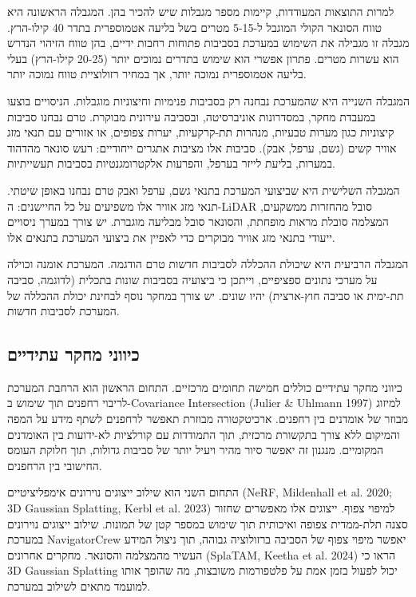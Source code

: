למרות התוצאות המעודדות, קיימות מספר מגבלות שיש להכיר בהן. המגבלה הראשונה היא טווח הסונאר הקולי המוגבל ל-5-15 מטרים בשל בליעה אטמוספרית בתדר 40 קילו-הרץ. מגבלה זו מגבילה את השימוש במערכת בסביבות פתוחות רחבות ידיים, בהן טווח הזיהוי הנדרש הוא עשרות מטרים. פתרון אפשרי הוא שימוש בתדרים נמוכים יותר (20-25 קילו-הרץ) בעלי בליעה אטמוספרית נמוכה יותר, אך במחיר רזולוציית טווח נמוכה יותר.

המגבלה השנייה היא שהמערכת נבחנה רק בסביבות פנימיות וחיצוניות מוגבלות. הניסויים בוצעו במעבדת מחקר, במסדרונות אוניברסיטה, ובסביבה עירונית מבוקרת. טרם נבחנו סביבות קיצוניות כגון מערות טבעיות, מנהרות תת-קרקעיות, יערות צפופים, או אזורים עם תנאי מזג אוויר קשים (גשם, ערפל, אבק). סביבות אלו מציבות אתגרים ייחודיים: רעש סונאר מהדהוד במערות, בליעת לייזר בערפל, והפרעות אלקטרומגנטיות בסביבות תעשייתיות.

המגבלה השלישית היא שביצועי המערכת בתנאי גשם, ערפל ואבק טרם נבחנו באופן שיטתי. תנאי מזג אוויר אלו משפיעים על כל החיישנים: ה-LiDAR סובל מהחזרות ממשקעים, המצלמה סובלת מראות מופחתת, והסונאר סובל מבליעה מוגברת. יש צורך במערך ניסויים ייעודי בתנאי מזג אוויר מבוקרים כדי לאפיין את ביצועי המערכת בתנאים אלו.

המגבלה הרביעית היא שיכולת ההכללה לסביבות חדשות טרם הודגמה. המערכת אומנה וכוילה על מערכי נתונים ספציפיים, וייתכן כי ביצועיה בסביבות שונות בתכלית (לדוגמה, סביבה תת-ימית או סביבה חוץ-ארצית) יהיו שונים. יש צורך במחקר נוסף לבחינת יכולת ההכללה של המערכת לסביבות חדשות.

\subsection{כיווני מחקר עתידיים}
\label{sec:ch09_future_work}

כיווני מחקר עתידיים כוללים חמישה תחומים מרכזיים. התחום הראשון הוא הרחבת המערכת לריבוי רחפנים תוך שימוש ב-Covariance Intersection (Julier & Uhlmann 1997) למיזוג מבוזר של אומדנים בין רחפנים. ארכיטקטורה מבוזרת תאפשר לרחפנים לשתף מידע על המפה והמיקום ללא צורך בתקשורת מרכזית, תוך התמודדות עם קורלציות לא-ידועות בין האומדנים המקומיים. מנגנון זה יאפשר סיור מהיר ויעיל יותר של סביבות גדולות, תוך חלוקת העומס החישובי בין הרחפנים.

התחום השני הוא שילוב ייצוגים נוירונים אימפליציטיים (NeRF, Mildenhall et al. 2020; 3D Gaussian Splatting, Kerbl et al. 2023) למיפוי צפוף. ייצוגים אלו מאפשרים שחזור סצנה תלת-ממדית צפופה ואיכותית תוך שימוש במספר קטן של תמונות. שילוב ייצוגים נוירונים במערכת NavigatorCrew יאפשר מיפוי צפוף של הסביבה ברזולוציה גבוהה, תוך ניצול המידע העשיר מהמצלמה והסונאר. מחקרים אחרונים (SplaTAM, Keetha et al. 2024) הראו כי 3D Gaussian Splatting יכול לפעול בזמן אמת על פלטפורמות משובצות, מה שהופך אותו למועמד מתאים לשילוב במערכת.


